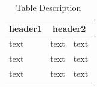 \begin{table}[h]                        
\begin{center}		                    %
\begin{tabular}[c]{|l|c|r|}             %

\hline                           %
\rowcolor{lightblue}
\textbf{header1} & \multicolumn{2}{c|}{\textbf{header2}}\\ %
\cline{2-3}
\hline \hline                           %
text & text & text\\          			%
\hline                                  %
text & text & text\\          			%
\hline                                  %
text & text & \cellcolor{yellow} text\\
\hline \hline                           %

\end{tabular}
\caption[Table Description]{Table Description}
\end{center}
\end{table}